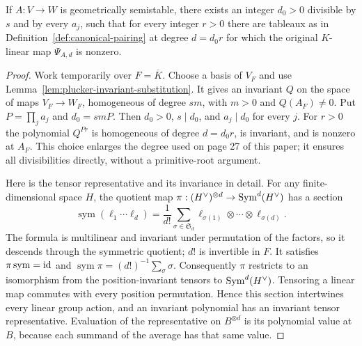 \begin{lemma}
\label{lem:nonzero-pairings}
\leanok
If $A:V\to W$ is geometrically semistable, there exists an integer $d_0>0$
divisible by $s$ and by every $a_j$, such that for every integer $r>0$ there
are tableaux as in Definition~\ref{def:canonical-pairing} at degree $d=d_0r$
for which the original $K$-linear map $\Psi_{A,d}$ is nonzero.
\end{lemma}
\begin{proof}
Work temporarily over $F=\overline K$. Choose a basis of $V_F$ and use
Lemma~\ref{lem:plucker-invariant-substitution}. It gives an invariant $Q$
on the space of maps $V_F\to W_F$, homogeneous of degree $sm$, with $m>0$
and $Q(A_F)\ne0$. Put $P=\prod_j a_j$ and $d_0=smP$. Then $d_0>0$, $s\mid d_0$,
and $a_j\mid d_0$ for every $j$. For $r>0$ the polynomial $Q^{Pr}$ is
homogeneous of degree $d=d_0r$, is invariant, and is nonzero at $A_F$.
This choice enlarges the degree used on page 27 of this paper; it ensures
all divisibilities directly, without a primitive-root argument.

Here is the tensor representative and its invariance in detail. For any
finite-dimensional space $H$, the quotient map
$\pi:(H^\vee)^{\otimes d}\to\operatorname{Sym}^d(H^\vee)$ has a section
\[
 \operatorname{sym}(\ell_1\cdots\ell_d)
 =\frac1{d!}\sum_{\sigma\in\mathfrak S_d}
       \ell_{\sigma(1)}\otimes\cdots\otimes\ell_{\sigma(d)}.
\]
The formula is multilinear and invariant under permutation of the factors,
so it descends through the symmetric quotient; $d!$ is invertible in $F$.
It satisfies $\pi\operatorname{sym}=\operatorname{id}$ and
$\operatorname{sym}\pi=(d!)^{-1}\sum_\sigma\sigma$.
Consequently $\pi$ restricts to an isomorphism from the position-invariant
tensors to $\operatorname{Sym}^d(H^\vee)$. Tensoring a linear map commutes with every
position permutation. Hence this section intertwines every linear group
action, and an invariant polynomial has an invariant tensor representative.
Evaluation of the representative on $B^{\otimes d}$ is its polynomial value
at $B$, because each summand of the average has that same value.


\end{proof}
